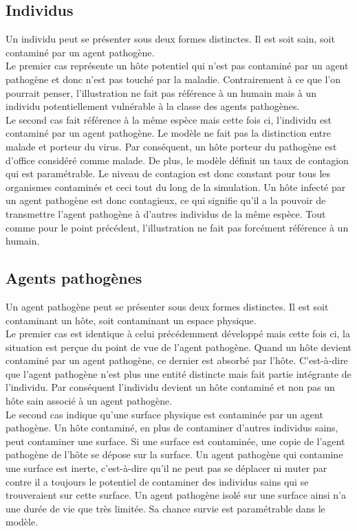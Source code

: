 \subsection{Individus}

Un individu peut se présenter sous deux formes distinctes. Il est soit sain, soit contaminé par un agent pathogène.\\

Le premier cas représente un hôte potentiel qui n'est pas contaminé par un agent pathogène et donc n'est pas touché par la maladie. Contrairement à ce que l'on pourrait penser, l'illustration ne fait pas référence à un humain mais à un individu potentiellement vulnérable à la classe des agents pathogènes.\\

Le second cas fait référence à la même espèce mais cette fois ci, l'individu est contaminé par un agent pathogène. Le modèle ne fait pas la distinction entre malade et porteur du virus. Par conséquent, un hôte porteur du pathogène est d'office considéré comme malade. De plus, le modèle définit un taux de contagion qui est paramétrable. Le niveau de contagion est donc constant pour tous les organismes contaminés et ceci tout du long de la simulation. Un hôte infecté par un agent pathogène est donc contagieux, ce qui signifie qu'il a la pouvoir de transmettre l'agent pathogène à d'autres individus de la même espèce. Tout comme pour le point précédent, l'illustration ne fait pas forcément référence à un humain.

\subsection{Agents pathogènes}

Un agent pathogène peut se présenter sous deux formes distinctes. Il est soit contaminant un hôte, soit contaminant un espace physique.\\

Le premier cas est identique à celui précédemment développé mais cette fois ci, la situation est perçue du point de vue de l'agent pathogène. Quand un hôte devient contaminé par un agent pathogène, ce dernier est absorbé par l'hôte. C'est-à-dire que l'agent pathogène n'est plus une entité distincte mais fait partie intégrante de l'individu. Par conséquent l'individu devient un hôte contaminé et non pas un hôte sain associé à un agent pathogène.\\

Le second cas indique qu'une surface physique est contaminée par un agent pathogène. Un hôte contaminé, en plus de contaminer d'autres individus sains, peut contaminer une surface. Si une surface est contaminée, une copie de l'agent pathogène de l'hôte se dépose sur la surface. Un agent pathogène qui contamine une surface est inerte, c'est-à-dire qu'il ne peut pas se déplacer ni muter par contre il a toujours le potentiel de contaminer des individus sains qui se trouveraient sur cette surface. Un agent pathogène isolé sur une surface ainsi n'a une durée de vie que très limitée. Sa chance survie est paramétrable dans le modèle.

